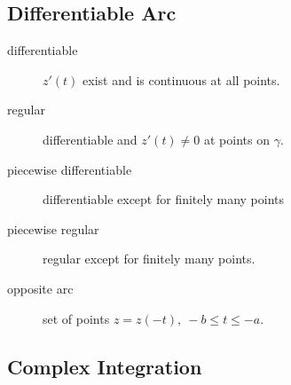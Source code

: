 \subsection{Differentiable Arc}


\begin{description}
	\item[differentiable] $z'(t)$ exist and is continuous at all points.
	\item[regular] differentiable and $z'(t) \ne 0$ at points on $\gamma$.
	\item[piecewise differentiable] differentiable except for finitely many points
	\item[piecewise regular] regular except for finitely many points.
	\item[opposite arc] set of points $z = z(-t),\ -b \le t \le -a$.
\end{description}


\subsection{Complex Integration}


